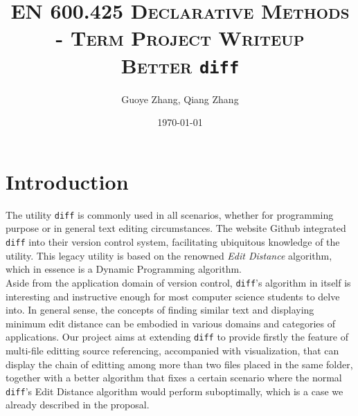 \documentclass{article}
\begin{document}
\title{\textsc{EN 600.425 Declarative Methods \\ - Term Project Writeup}\\ \textbf{\textsc{Better } \texttt{diff}}} %
\author{Guoye Zhang, Qiang Zhang\\
        }  %
\date{\today}  %
\maketitle

\section{Introduction}
The utility \texttt{diff} is commonly used in all scenarios, whether for programming purpose or in general text editing circumstances. The website Github integrated \texttt{diff} into their version control system, facilitating ubiquitous knowledge of the utility. This legacy utility is based on the renowned \textit{Edit Distance} algorithm, which in essence is a Dynamic Programming algorithm. \\

Aside from the application domain of version control, \texttt{diff}'s algorithm in itself is interesting and instructive enough for most computer science students to delve into. In general sense, the concepts of finding similar text and displaying minimum edit distance can be embodied in various domains and categories of applications. Our project aims at extending \texttt{diff} to provide firstly the feature of multi-file editting source referencing, accompanied with visualization, that can display the chain of editting among more than two files placed in the same folder, together with a better algorithm that fixes a certain scenario where the normal \texttt{diff}'s Edit Distance algorithm would perform suboptimally, which is a case we already described in the proposal.\\
\end{document}
